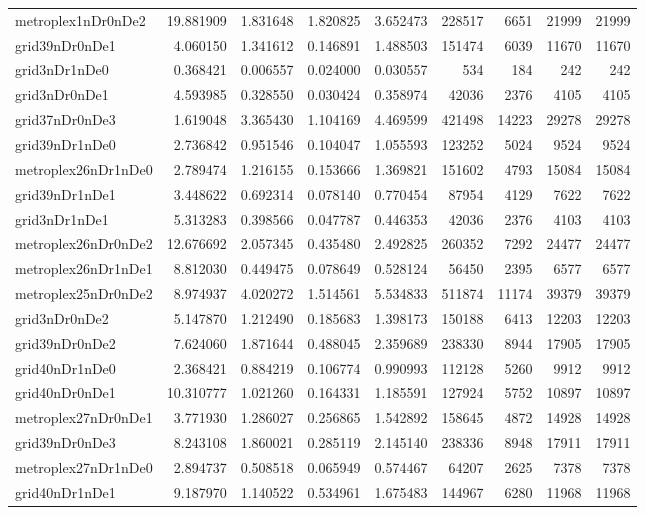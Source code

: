 \begin{longtable}{|l|r|r|r|r|r|r|r|r|}
metroplex1nDr0nDe2 & 19.881909 & 1.831648 & 1.820825 & 3.652473 & 228517 & 6651 & 21999 & 21999 \\
grid39nDr0nDe1 & 4.060150 & 1.341612 & 0.146891 & 1.488503 & 151474 & 6039 & 11670 & 11670 \\
grid3nDr1nDe0 & 0.368421 & 0.006557 & 0.024000 & 0.030557 & 534 & 184 & 242 & 242 \\
grid3nDr0nDe1 & 4.593985 & 0.328550 & 0.030424 & 0.358974 & 42036 & 2376 & 4105 & 4105 \\
grid37nDr0nDe3 & 1.619048 & 3.365430 & 1.104169 & 4.469599 & 421498 & 14223 & 29278 & 29278 \\
grid39nDr1nDe0 & 2.736842 & 0.951546 & 0.104047 & 1.055593 & 123252 & 5024 & 9524 & 9524 \\
metroplex26nDr1nDe0 & 2.789474 & 1.216155 & 0.153666 & 1.369821 & 151602 & 4793 & 15084 & 15084 \\
grid39nDr1nDe1 & 3.448622 & 0.692314 & 0.078140 & 0.770454 & 87954 & 4129 & 7622 & 7622 \\
grid3nDr1nDe1 & 5.313283 & 0.398566 & 0.047787 & 0.446353 & 42036 & 2376 & 4103 & 4103 \\
metroplex26nDr0nDe2 & 12.676692 & 2.057345 & 0.435480 & 2.492825 & 260352 & 7292 & 24477 & 24477 \\
metroplex26nDr1nDe1 & 8.812030 & 0.449475 & 0.078649 & 0.528124 & 56450 & 2395 & 6577 & 6577 \\
metroplex25nDr0nDe2 & 8.974937 & 4.020272 & 1.514561 & 5.534833 & 511874 & 11174 & 39379 & 39379 \\
grid3nDr0nDe2 & 5.147870 & 1.212490 & 0.185683 & 1.398173 & 150188 & 6413 & 12203 & 12203 \\
grid39nDr0nDe2 & 7.624060 & 1.871644 & 0.488045 & 2.359689 & 238330 & 8944 & 17905 & 17905 \\
grid40nDr1nDe0 & 2.368421 & 0.884219 & 0.106774 & 0.990993 & 112128 & 5260 & 9912 & 9912 \\
grid40nDr0nDe1 & 10.310777 & 1.021260 & 0.164331 & 1.185591 & 127924 & 5752 & 10897 & 10897 \\
metroplex27nDr0nDe1 & 3.771930 & 1.286027 & 0.256865 & 1.542892 & 158645 & 4872 & 14928 & 14928 \\
grid39nDr0nDe3 & 8.243108 & 1.860021 & 0.285119 & 2.145140 & 238336 & 8948 & 17911 & 17911 \\
metroplex27nDr1nDe0 & 2.894737 & 0.508518 & 0.065949 & 0.574467 & 64207 & 2625 & 7378 & 7378 \\
grid40nDr1nDe1 & 9.187970 & 1.140522 & 0.534961 & 1.675483 & 144967 & 6280 & 11968 & 11968 \\

\end{longtable}

